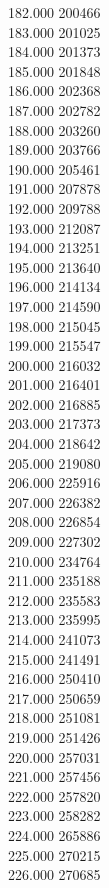 { 182.000	200466 \\
 183.000	201025 \\
 184.000	201373 \\
 185.000	201848 \\
 186.000	202368 \\
 187.000	202782 \\
 188.000	203260 \\
 189.000	203766 \\
 190.000	205461 \\
 191.000	207878 \\
 192.000	209788 \\
 193.000	212087 \\
 194.000	213251 \\
 195.000	213640 \\
 196.000	214134 \\
 197.000	214590 \\
 198.000	215045 \\
 199.000	215547 \\
 200.000	216032 \\
 201.000	216401 \\
 202.000	216885 \\
 203.000	217373 \\
 204.000	218642 \\
 205.000	219080 \\
 206.000	225916 \\
 207.000	226382 \\
 208.000	226854 \\
 209.000	227302 \\
 210.000	234764 \\
 211.000	235188 \\
 212.000	235583 \\
 213.000	235995 \\
 214.000	241073 \\
 215.000	241491 \\
 216.000	250410 \\
 217.000	250659 \\
 218.000	251081 \\
 219.000	251426 \\
 220.000	257031 \\
 221.000	257456 \\
 222.000	257820 \\
 223.000	258282 \\
 224.000	265886 \\
 225.000	270215 \\
 226.000	270685 \\
}
